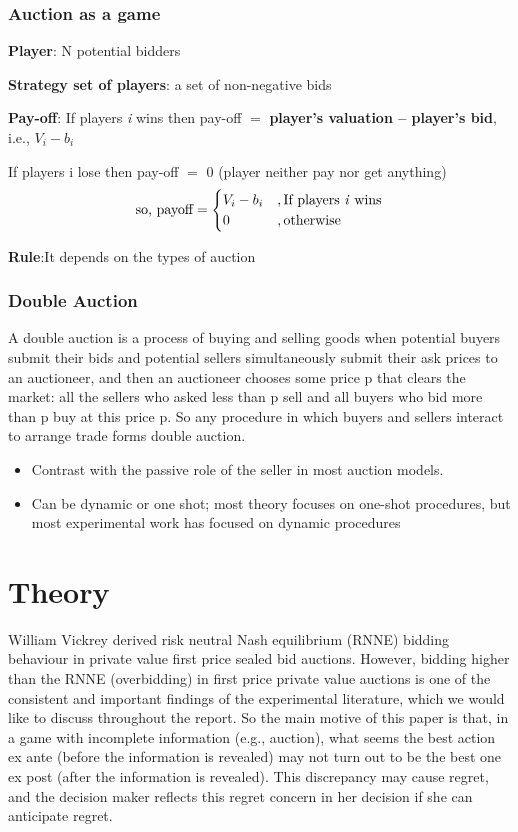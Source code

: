 \documentclass[10pt,a4paper,oneside]{report}
\begin{document}
				\subsubsection{Auction as a game}
\begin{flushleft}
 \textbf{Player}: N potential bidders
	
	\textbf{Strategy set of players}: a set of non-negative bids

\textbf{Pay-off}: If players \textit{i} wins then pay-off $=$ \textbf{player's valuation – player's bid}, i.e., $V_i-b_i$
  			    
 
If players i lose then pay-off $=$ $0$ (player neither pay nor get anything)
\begin{equation*}   
\text{so, payoff} = 
\begin{cases}
V_i-b_i&,\text{If players \textit{i} wins}
\\
0  &,\text{otherwise}   

\end{cases}
\end{equation*}
  
  \textbf{Rule}:It depends on the types of auction
 \end{flushleft}
  		
  \subsubsection{Double Auction}
  A double auction is a process of buying and selling goods when potential buyers submit their bids and potential sellers simultaneously submit their ask prices to an auctioneer, and then an auctioneer chooses some price p that clears the market: all the sellers who asked less than p sell and all buyers who bid more than p buy at this price p. So any procedure in which buyers and sellers interact to arrange trade forms double auction.
  \begin{itemize}
 \item Contrast with the passive role of the seller in most auction models.
 \item Can be dynamic or one shot; most theory focuses on one-shot procedures, but most experimental work has focused on dynamic procedures
\end{itemize}  	       

\section{Theory}
William Vickrey derived risk neutral Nash equilibrium (RNNE) bidding behaviour in private value first price sealed bid auctions. However, bidding higher than the RNNE (overbidding) in first price private value auctions is one of the consistent and important findings of the experimental literature, which we would like to discuss throughout the report. So the main motive of this paper is that, in a game with incomplete information (e.g., auction), what seems the best action ex ante (before the information is revealed) may not turn out to be the best one ex post (after the information is revealed). This discrepancy may cause regret, and the decision maker reflects this regret concern in her decision if she can anticipate regret.
\end{document}
